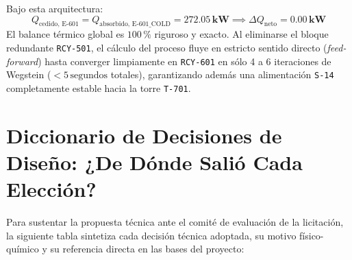 \documentclass[11pt,a4paper]{article}
\begin{document}
\begin{enumerate}
    Bajo esta arquitectura:
    \begin{equation}
        Q_{\text{cedido, E-601}} = Q_{\text{absorbido, E-601\_COLD}} = \mathbf{272.05\,\text{kW}} \implies \Delta Q_{\text{neto}} = \mathbf{0.00\,\text{kW}}
    \end{equation}
    El balance térmico global es $100\,\%$ riguroso y exacto. Al eliminarse el bloque redundante \texttt{RCY-501}, el cálculo del proceso fluye en estricto sentido directo (\textit{feed-forward}) hasta converger limpiamente en \texttt{RCY-601} en sólo 4 a 6 iteraciones de Wegstein ($<5\,\text{segundos}$ totales), garantizando además una alimentación \texttt{S-14} completamente estable hacia la torre \texttt{T-701}.
\end{enumerate}

\section{Diccionario de Decisiones de Diseño: ¿De Dónde Salió Cada Elección?}

Para sustentar la propuesta técnica ante el comité de evaluación de la licitación, la siguiente tabla sintetiza cada decisión técnica adoptada, su motivo físico-químico y su referencia directa en las bases del proyecto:
\end{document}
